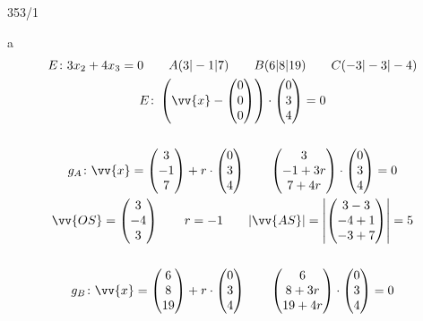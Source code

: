 \newpage
\begin{exercise}{353/1}
  \item [a]
  \begin{gather*}
    E \colon 3x_2 + 4x_3 = 0 \qquad A(3|-1|7) \qquad B(6|8|19) \qquad C(-3|-3|-4) \\
    E \colon \left(\vv{x} - \begin{pmatrix}0 \\ 0 \\ 0\end{pmatrix}\right) \cdot \begin{pmatrix}0 \\ 3 \\ 4\end{pmatrix} = 0 \\\\
    g_A \colon \vv{x} = \begin{pmatrix}3 \\ -1 \\ 7\end{pmatrix} + r \cdot \begin{pmatrix}0 \\ 3 \\ 4\end{pmatrix} \qquad \begin{pmatrix}3 \\ -1 + 3r \\ 7 + 4r\end{pmatrix} \cdot \begin{pmatrix}0 \\ 3 \\ 4\end{pmatrix} = 0 \\
    \vv{OS} = \begin{pmatrix}3 \\ -4 \\ 3\end{pmatrix} \qquad r = -1 \qquad |\vv{AS}| = \left|\begin{pmatrix}3 - 3 \\ -4 + 1 \\ -3 + 7\end{pmatrix}\right| = 5 \\\\
    g_B \colon \vv{x} = \begin{pmatrix}6 \\ 8 \\ 19\end{pmatrix} + r \cdot \begin{pmatrix}0 \\ 3 \\ 4\end{pmatrix} \qquad \begin{pmatrix}6 \\ 8 + 3r \\ 19 + 4r\end{pmatrix} \cdot \begin{pmatrix}0 \\ 3 \\ 4\end{pmatrix} = 0 \\

\end{gather*}
\end{exercise}
